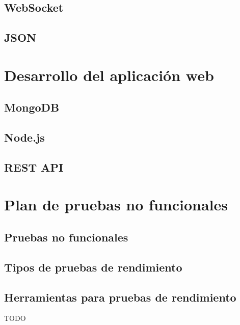 \subsection{WebSocket}

\subsection{JSON}

\clearpage

\section{Desarrollo del aplicación web}

\subsection{MongoDB}

\subsection{Node.js}

\subsection{REST API}

\clearpage

\section{Plan de pruebas no funcionales}

\subsection{Pruebas no funcionales}

\subsection{Tipos de pruebas de rendimiento}

\subsection{Herramientas para pruebas de rendimiento}

TODO
